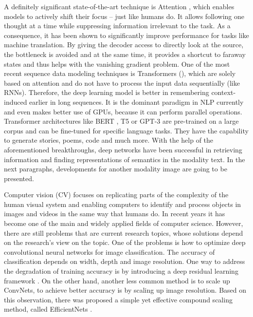 \documentclass[
]{krantz}
\begin{document}
A definitely significant state-of-the-art technique is Attention \citet{Bahdanau2014}, which enables models to actively shift their focus -- just like humans do. It allows following one thought at a time while suppressing information irrelevant to the task. As a consequence, it has been shown to significantly improve performance for tasks like machine translation. By giving the decoder access to directly look at the source, the bottleneck is avoided and at the same time, it provides a shortcut to faraway states and thus helps with the vanishing gradient problem. One of the most recent sequence data modeling techniques is Transformers (\citet{vaswani2017attention}), which are solely based on attention and do not have to process the input data sequentially (like RNNs). Therefore, the deep learning model is better in remembering context-induced earlier in long sequences. It is the dominant paradigm in NLP currently and even makes better use of GPUs, because it can perform parallel operations. Transformer architectures like BERT \citep{Devlin2018}, T5 \citep{Raffel2019} or GPT-3 \citep{brown2020language} are pre-trained on a large corpus and can be fine-tuned for specific language tasks. They have the capability to generate stories, poems, code and much more. With the help of the aforementioned breakthroughs, deep networks have been successful in retrieving information and finding representations of semantics in the modality text. In the next paragraphs, developments for another modality image are going to be presented.

Computer vision (CV) focuses on replicating parts of the complexity of the human visual system and enabling computers to identify and process objects in images and videos in the same way that humans do. In recent years it has become one of the main and widely applied fields of computer science. However, there are still problems that are current research topics, whose solutions depend on the research's view on the topic. One of the problems is how to optimize deep convolutional neural networks for image classification. The accuracy of classification depends on width, depth and image resolution. One way to address the degradation of training accuracy is by introducing a deep residual learning framework \citep{ResNet}. On the other hand, another less common method is to scale up ConvNets, to achieve better accuracy is by scaling up image resolution. Based on this observation, there was proposed a simple yet effective compound scaling method, called EfficientNets \citep{EfficientNet}.
\end{document}
